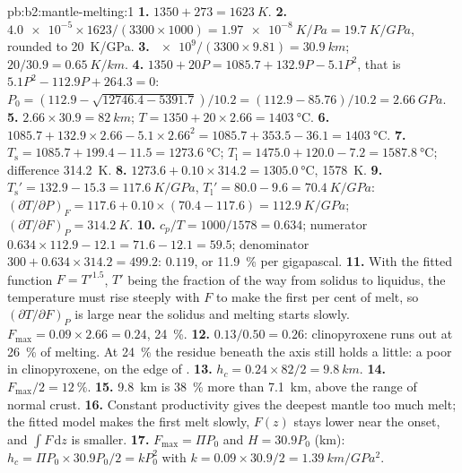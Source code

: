 \begin{solution}{pb:b2:mantle-melting:1}
\textbf{1.} $1350 + 273 = \qty{1623}{K}$.
\textbf{2.} $\num{4.0e-5}\times1623/(3300\times1000) = \qty{1.97e-8}{K/Pa} =
\qty{19.7}{K/GPa}$, rounded to \qty{20}{K/GPa}.
\textbf{3.} $\num{e9}/(3300\times9.81) = \qty{30.9}{km}$; $20/30.9 =
\qty{0.65}{K/km}$.
\textbf{4.} $1350 + 20P = 1085.7 + 132.9P - 5.1P^2$, that is $5.1P^2 - 112.9P +
264.3 = 0$: $P_0 = (112.9 - \sqrt{12746.4 - 5391.7})/10.2 = (112.9 - 85.76)/10.2 =
\qty{2.66}{GPa}$.
\textbf{5.} $2.66\times30.9 = \qty{82}{km}$; $T = 1350 + 20\times2.66 =
\qty{1403}{\celsius}$.
\textbf{6.} $1085.7 + 132.9\times2.66 - 5.1\times2.66^2 = 1085.7 + 353.5 - 36.1 =
\qty{1403}{\celsius}$.
\textbf{7.} $T_{\mathrm s} = 1085.7 + 199.4 - 11.5 = \qty{1273.6}{\celsius}$;
$T_{\mathrm l} = 1475.0 + 120.0 - 7.2 = \qty{1587.8}{\celsius}$; difference
\qty{314.2}{K}.
\textbf{8.} $1273.6 + 0.10\times314.2 = \qty{1305.0}{\celsius}$, \qty{1578}{K}.
\textbf{9.} $T_{\mathrm s}' = 132.9 - 15.3 = \qty{117.6}{K/GPa}$, $T_{\mathrm l}' =
80.0 - 9.6 = \qty{70.4}{K/GPa}$: $(\partial T/\partial P)_F = 117.6 +
0.10\times(70.4 - 117.6) = \qty{112.9}{K/GPa}$; $(\partial T/\partial F)_P =
\qty{314.2}{K}$.
\textbf{10.} $c_p/T = 1000/1578 = 0.634$; numerator $0.634\times112.9 - 12.1 = 71.6
- 12.1 = 59.5$; denominator $300 + 0.634\times314.2 = 499.2$: $0.119$, or
\qty{11.9}{\percent} per gigapascal.
\textbf{11.} With the fitted function $F = T'^{1.5}$, $T'$ being the fraction of the way from solidus to liquidus, the temperature must rise steeply with $F$ to make
the first per cent of melt, so $(\partial T/\partial F)_P$ is large near the solidus
and melting starts slowly. $F_{\max} = 0.09\times2.66 = 0.24$, \qty{24}{\percent}.
\textbf{12.} $0.13/0.50 = 0.26$: clinopyroxene runs out at \qty{26}{\percent} of
melting. At \qty{24}{\percent} the residue beneath the axis still holds a little:
a  poor in clinopyroxene, on the edge of .
\textbf{13.} $h_c = 0.24\times82/2 = \qty{9.8}{km}$.
\textbf{14.} $F_{\max}/2 = \qty{12}{\percent}$.
\textbf{15.} \qty{9.8}{km} is \qty{38}{\percent} more than \qty{7.1}{km}, above the
range of normal crust.
\textbf{16.} Constant productivity gives the deepest mantle too much melt; the
fitted model makes the first melt slowly, $F(z)$ stays lower near the onset, and
$\int F\,\mathrm dz$ is smaller.
\textbf{17.} $F_{\max} = \Pi P_0$ and $H = 30.9P_0$ (km): $h_c = \Pi P_0\times30.9P_0/2
= kP_0^2$ with $k = 0.09\times30.9/2 = \qty{1.39}{km/GPa^2}$.

\end{solution}
